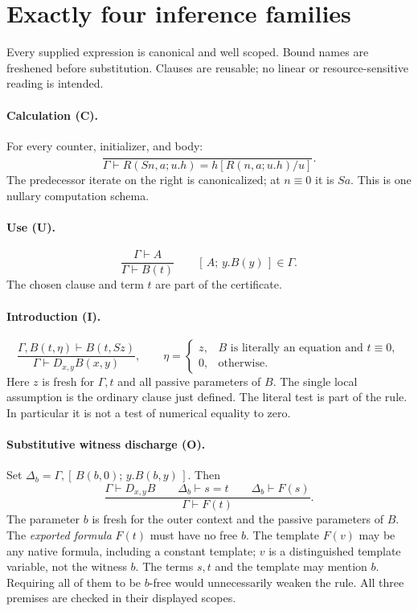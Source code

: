 \documentclass[11pt]{article}
\theoremstyle{definition}\newtheorem{definition}[theorem]{Definition}
\newcommand{\lit}{\equiv}
\newcommand{\cl}[2]{[\,#1;\,#2\,]}
\begin{document}
\section{Exactly four inference families}

Every supplied expression is canonical and well scoped. Bound names
are freshened before substitution. Clauses are reusable; no linear or
resource-sensitive reading is intended.

\paragraph{Calculation (C).}
For every counter, initializer, and body:
\[
 \frac{}{\Gamma\vdash
 R(Sn,a;u.h)=h[R(n,a;u.h)/u]}.
 \tag{C}\label{rule:c}
\]
The predecessor iterate on the right is canonicalized; at $n\lit0$
it is $Sa$. This is one nullary computation schema.

\paragraph{Use (U).}
\[
 \frac{\Gamma\vdash A}{\Gamma\vdash B(t)}
 \qquad\cl{A}{y.B(y)}\in\Gamma.
 \tag{U}\label{rule:u}
\]
The chosen clause and term $t$ are part of the certificate.

\paragraph{Introduction (I).}
\[
 \frac{\Gamma,B(t,\eta)\vdash B(t,Sz)}
      {\Gamma\vdash D_{x,y}B(x,y)},
 \qquad
 \eta=\begin{cases}
 z,&B\text{ is literally an equation and }t\lit0,\\
 0,&\text{otherwise}.
 \end{cases}
 \tag{I}\label{rule:i}
\]
Here $z$ is fresh for $\Gamma,t$ and all passive parameters of $B$.
The single local assumption is the ordinary clause just defined.
The literal test is part of the rule. In particular it is not a test
of numerical equality to zero.

\paragraph{Substitutive witness discharge (O).}
Set $\Delta_b=\Gamma,\cl{B(b,0)}{y.B(b,y)}$. Then
\[
 \frac{\Gamma\vdash D_{x,y}B\qquad
       \Delta_b\vdash s=t\qquad
       \Delta_b\vdash F(s)}
      {\Gamma\vdash F(t)}.
 \tag{O}\label{rule:o}
\]
The parameter $b$ is fresh for the outer context and the passive
parameters of $B$. The \emph{exported formula} $F(t)$ must have no free
$b$. The template $F(v)$ may be any native formula, including a constant
template; $v$ is a distinguished template variable, not the witness $b$.
The terms $s,t$ and the template may mention $b$. Requiring all of them
to be $b$-free would unnecessarily weaken the rule. All three premises
are checked in their displayed scopes.
\end{document}
